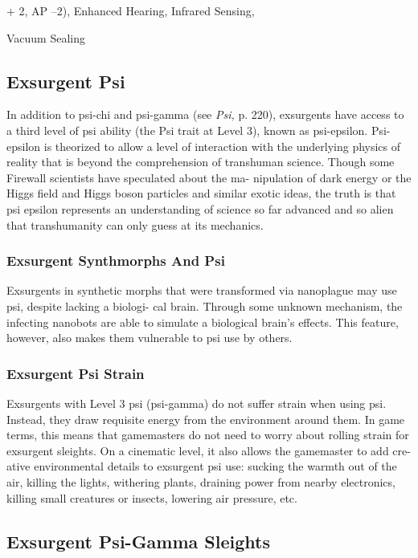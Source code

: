 + 2, AP –2), Enhanced Hearing, Infrared Sensing, 

Vacuum Sealing

\subsection{Exsurgent Psi }

In addition to psi-chi and psi-gamma (see \textit{Psi,} p. 220), 
exsurgents have access to a third level of psi ability 
(the Psi trait at Level 3), known as psi-epsilon. Psi-
epsilon is theorized to allow a level of interaction with 
the underlying physics of reality that is beyond the 
comprehension of transhuman science. Though some 
Firewall scientists have speculated about the ma-
nipulation of dark energy or the Higgs field and Higgs 
boson particles and similar exotic ideas, the truth is 
that psi epsilon represents an understanding of science 
so far advanced and so alien that transhumanity can 
only guess at its mechanics.

\subsubsection{Exsurgent Synthmorphs And Psi}

Exsurgents in synthetic morphs that were transformed 
via nanoplague may use psi, despite lacking a biologi-
cal brain. Through some unknown mechanism, the 
infecting nanobots are able to simulate a biological 
brain's effects. This feature, however, also makes them 
vulnerable to psi use by others.

\subsubsection{Exsurgent Psi Strain}

Exsurgents with Level 3 psi (psi-gamma) do not suffer 
strain when using psi. Instead, they draw requisite 
energy from the environment around them. In game 
terms, this means that gamemasters do not need to 
worry about rolling strain for exsurgent sleights. On a 
cinematic level, it also allows the gamemaster to add cre-
ative environmental details to exsurgent psi use: sucking 
the warmth out of the air, killing the lights, withering 
plants, draining power from nearby electronics, killing 
small creatures or insects, lowering air pressure, etc. 

\subsection{Exsurgent Psi-Gamma Sleights }

